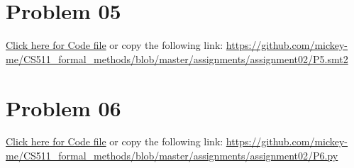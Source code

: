 \documentclass[11pt,leqno,fleqn]{article}
\begin{document}







\pagebreak
\section{Problem 05}
\href{https://github.com/mickey-me/CS511_formal_methods/blob/master/assignments/assignment02/P5.smt2}{Click here for Code file}
or copy the following link:
\url{https://github.com/mickey-me/CS511_formal_methods/blob/master/assignments/assignment02/P5.smt2}


\section{Problem 06}
\href{https://github.com/mickey-me/CS511_formal_methods/blob/master/assignments/assignment02/P6.py}{Click here for Code file}
or copy the following link:
\url{https://github.com/mickey-me/CS511_formal_methods/blob/master/assignments/assignment02/P6.py}
\end{document}
